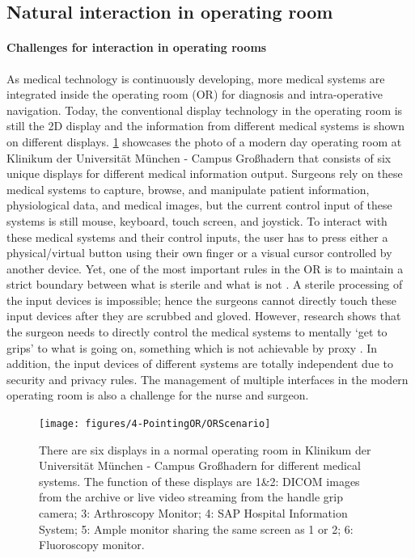 \subsection{Natural interaction in operating room}
\paragraph{Challenges for interaction in operating rooms}
As medical technology is continuously developing, more medical systems are integrated inside the operating room (OR) for diagnosis and intra-operative navigation. Today, the conventional display technology in the operating room is still the 2D display and the information from different medical systems is shown on different displays.
\figurename{\ref{fig:1-intro:ORScenario}} showcases the photo of a modern day operating room at Klinikum der Universit\"at M\"unchen - Campus Gro{\ss}hadern that consists of six unique displays for different medical information output. 
Surgeons rely on these medical systems to capture, browse, and manipulate patient information, physiological data, and medical images, but the current control input of these systems is still mouse, keyboard, touch screen, and joystick. To interact with these medical systems and their control inputs, the user has to press either a physical/virtual button using their own finger or a visual cursor controlled by another device. 
Yet, one of the most important rules in the OR is to maintain a strict boundary between what is sterile and what is not \cite{OHara2014a}. A sterile processing of the input devices is impossible; hence the surgeons cannot directly touch these input devices after they are scrubbed and gloved. However, research shows that the surgeon needs to directly control the medical systems to mentally `get to grips' to what is going on, something which is not achievable by proxy \cite{Johnson2011a}. In addition, the input devices of different systems are totally independent due to security and privacy rules. The management of multiple interfaces in the modern operating room is also a challenge for the nurse and surgeon.
\begin{figure} [htb]
	\centering
	\texttt{[image: figures/4-PointingOR/ORScenario]}
	\caption{There are six displays in a normal operating room in Klinikum der Universit\"at M\"unchen - Campus Gro{\ss}hadern for different medical systems. The function of these displays are 1\&2: DICOM images from the archive or live video streaming from the handle grip camera; 3: Arthroscopy Monitor; 4: SAP Hospital Information System; 5: Ample monitor sharing the same screen as 1 or 2; 6: Fluoroscopy monitor.}
	\label{fig:1-intro:ORScenario}       %
\end{figure}
